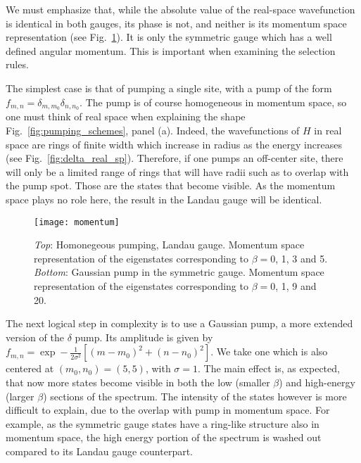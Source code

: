 \documentclass[twocolumn, 10pt, aps, superscriptaddress, floatfix, showpacs, pra, citeautoscript]{revtex4-1}
\newcommand{\co}[2]{#2}
\renewcommand{\paragraph}{\co}
\begin{document}
We must emphasize that, while the absolute value of the real-space
wavefunction is identical in both gauges, its phase is not, and
neither is its momentum space representation (see
Fig.~\ref{fig:hom_mom_sp}). It is only the symmetric gauge which has a
well defined angular momentum. This is important when examining the
selection rules.

\paragraph{A δ pump in real space is homogeneous in momentum space.}

The simplest case is that of pumping a single site, with a pump of the
form $f_{m,n} = \delta_{m,m_0} \delta_{n,n_0}$. The pump is of course
homogeneous in momentum space, so one must think of real space when
explaining the shape Fig.~\ref{fig:pumping_schemes}, panel (a).
Indeed, the wavefunctions of $H$ in real space are rings of finite
width which increase in radius as the energy increases (see
Fig.~\ref{fig:delta_real_sp}). Therefore, if one pumps an off-center
site, there will only be a limited range of rings that will have radii
such as to overlap with the pump spot. Those are the states that
become visible. As the momentum space plays no role here, the result
in the Landau gauge will be identical.
%
\begin{figure}[htb]\centering
  \texttt{[image: momentum]}
  \caption{\emph{Top}: Homonegeous pumping, Landau gauge. Momentum
    space representation of the eigenstates corresponding to
    $\beta=0$, 1, 3 and 5.  
    \emph{Bottom}: Gaussian pump in the
    symmetric gauge. Momentum space representation of the eigenstates
    corresponding to $\beta=0$, 1, 9 and 20.}
  \label{fig:hom_mom_sp}
\end{figure}


\paragraph{Gaussian pumping is now bound also in momentum space.}
The next logical step in complexity is to use a Gaussian pump, a more
extended version of the $\delta$ pump. Its amplitude is given by
$f_{m,n} = \exp- \frac{1}{2\sigma^2} \left[(m-m_0)^2 + (n-n_0)^2
\right]$.
We take one which is also centered at $(m_0,n_0) = (5,5)$, with
$\sigma =1$. The main effect is, as expected, that now more states
become visible in both the low (smaller $\beta$) and high-energy
(larger $\beta$) sections of the spectrum. The intensity of the states
however is more difficult to explain, due to the overlap with pump in
momentum space. For example, as the symmetric gauge states have a
ring-like structure also in momentum space, the high energy portion of
the spectrum is washed out compared to its Landau gauge counterpart.
\end{document}
